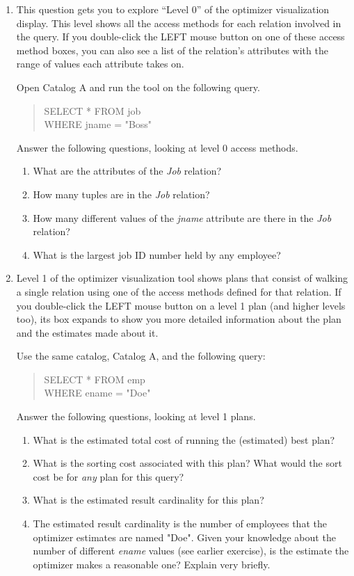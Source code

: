 \begin{enumerate}
\item
This question gets you to explore ``Level 0'' of the optimizer visualization
display.  This level shows all the access methods for each relation involved
in the query.  If you double-click the LEFT mouse button on one of these
access method boxes, you can also see a list of the relation's attributes
with the range of values each attribute takes on.

Open Catalog A and run the tool on the following query.  
\begin{quote}
        SELECT * FROM job\\
        WHERE jname = "Boss"
\end{quote}

Answer the following questions, looking at level 0 access methods.
\begin{enumerate}
\item
What are the attributes of the {\em Job} relation?
\item
How many tuples are in the {\em Job} relation?
\item
How many different values of the {\em jname} attribute are there in
the {\em Job} relation?
\item
What is the largest job ID number held by any employee?
\end{enumerate}


\item

Level 1 of the optimizer visualization tool shows plans that consist of
walking a single relation using one of the access methods defined for that
relation.  If you double-click the LEFT mouse button on a level 1 plan (and
higher levels too), its box expands to show you more detailed information
about the plan and the estimates made about it.

Use the same catalog, Catalog A, and the following query:
\begin{quote}
        SELECT * FROM emp\\
        WHERE ename = "Doe"
\end{quote}

Answer the following questions, looking at level 1 plans.
\begin{enumerate}
\item
What is the estimated total cost of running the (estimated) best plan?
\item
What is the sorting cost associated with
this plan?  What would the sort cost be for {\em any}
plan for this query?
\item
What is the estimated result cardinality for this plan?
\item
The estimated result cardinality is the number of employees that the
optimizer estimates are named "Doe".  Given your knowledge about
the number of different {\em ename} values (see earlier exercise),
is the estimate the optimizer makes a reasonable one? Explain very briefly.
\end{enumerate}



\end{enumerate}
